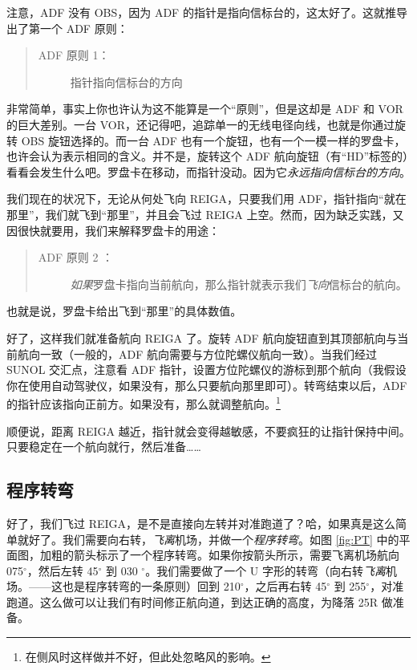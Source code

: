 注意，ADF 没有 OBS，因为 ADF 的指针是指向信标台的，这太好了。这就推导出了第一个 ADF 原则：

\begin{quote}
  \begin{description}
  \item[ADF 原则 1：] 指针指向信标台的方向
  \end{description}
\end{quote}

非常简单，事实上你也许认为这不能算是一个“原则”，但是这却是 ADF 和 VOR 的巨大差别。一台 VOR，还记得吧，追踪单一的无线电径向线，也就是你通过旋转 OBS 旋钮选择的。而一台 ADF 也有一个旋钮，也有一个一模一样的罗盘卡，也许会认为表示相同的含义。并不是，旋转这个 ADF 航向旋钮（有“HD”标签的）看看会发生什么吧。罗盘卡在移动，而指针没动。因为它\emph{永远指向信标台的方向}。

我们现在的状况下，无论从何处飞向 REIGA，只要我们用 ADF，指针指向“就在那里”，我们就飞到“那里”，并且会飞过 REIGA 上空。然而，因为缺乏实践，又因很快就要用，我们来解释罗盘卡的用途：

\begin{quote}
  \begin{description}
  \item[ADF 原则 2 ：] \emph{如果}罗盘卡指向当前航向，那么指针就表示我们\emph{飞向}信标台的航向。
  \end{description}
\end{quote}

也就是说，罗盘卡给出飞到“那里”的具体数值。

好了，这样我们就准备航向 REIGA 了。旋转 ADF 航向旋钮直到其顶部航向与当前航向一致（一般的，ADF 航向需要与方位陀螺仪航向一致）。当我们经过 SUNOL 交汇点，注意看 ADF 指针，设置方位陀螺仪的游标到那个航向（我假设你在使用自动驾驶仪，如果没有，那么只要航向那里即可）。转弯结束以后，ADF 的指针应该指向正前方。如果没有，那么就调整航向。\footnote{在侧风时这样做并不好，但此处忽略风的影响。}

顺便说，距离 REIGA 越近，指针就会变得越敏感，不要疯狂的让指针保持中间。只要稳定在一个航向就行，然后准备……

\subsection{程序转弯}

好了，我们飞过 REIGA，是不是直接向左转并对准跑道了？哈，如果真是这么简单就好了。我们需要向右转，\emph{飞离}机场，并做一个\emph{程序转弯}。如图 \ref{fig:PT} 中的平面图，加粗的箭头标示了一个程序转弯。如果你按箭头所示，需要飞离机场航向 075$^\circ$，然后左转 45$^\circ$ 到 030 $^\circ$。我们需要做了一个 U 字形的转弯（向右转\emph{飞离}机场。——这也是程序转弯的一条原则）回到 210$^\circ$，之后再右转 45$^\circ$ 到 255$^\circ$，对准跑道。这么做可以让我们有时间修正航向道，到达正确的高度，为降落 25R 做准备。

